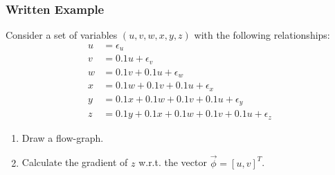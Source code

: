 \documentclass{beamer}
\begin{document}
\begin{frame}
  \frametitle{Written Example}
  Consider a set of variables $(u,v,w,x,y,z)$ with the following relationships:
  \begin{align*}
    u &= \epsilon_u\\
    v &= 0.1 u+\epsilon_v\\
    w &= 0.1 v + 0.1 u + \epsilon_w\\
    x &= 0.1 w + 0.1 v + 0.1 u +\epsilon_x\\
    y &= 0.1 x + 0.1 w + 0.1 v+ 0.1 u+\epsilon_y\\
    z &= 0.1 y+ 0.1 x + 0.1 w + 0.1 v+ 0.1 u+\epsilon_z
  \end{align*}
  \begin{enumerate}
  \item Draw a flow-graph.
  \item Calculate the gradient of $z$ w.r.t. the vector $\vec\phi=[u,v]^T$.
  \end{enumerate}
\end{frame}
  
\end{document}
